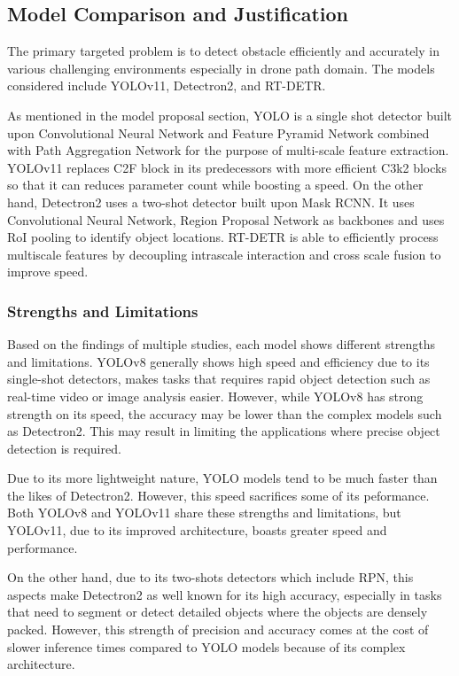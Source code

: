 \documentclass[stu,12pt,floatsintext]{apa7}
\begin{document}
\subsection{Model Comparison and Justification}

The primary targeted problem is to detect obstacle efficiently and accurately in various challenging environments especially in drone path domain. The models considered include YOLOv11, Detectron2, and RT-DETR.

As mentioned in the model proposal section, YOLO is a single shot detector built upon Convolutional Neural Network and Feature Pyramid Network combined with Path Aggregation Network for the purpose of multi-scale feature extraction. YOLOv11 replaces C2F block in its predecessors with more efficient C3k2 blocks so that it can reduces parameter count while boosting a speed. On the other hand, Detectron2 uses a two-shot detector built upon Mask RCNN. It uses Convolutional Neural Network, Region Proposal Network as backbones and uses RoI pooling to identify object locations. RT-DETR is able to efficiently process multiscale features by decoupling intrascale interaction and cross scale fusion to improve speed.


\subsubsection{Strengths and Limitations}
Based on the findings of multiple studies, each model shows different strengths and limitations. YOLOv8 generally shows high speed and efficiency due to its single-shot detectors, makes tasks that requires rapid object detection such as real-time video or image analysis easier. However, while YOLOv8 has strong strength on its speed, the accuracy may be lower than the complex models such as Detectron2. This may result in limiting the applications where precise object detection is required.

Due to its more lightweight nature, YOLO models tend to be much faster than the likes of Detectron2. However, this speed sacrifices some of its peformance. Both YOLOv8 and YOLOv11 share these strengths and limitations, but YOLOv11, due to its improved architecture, boasts greater speed and performance.

On the other hand, due to its two-shots detectors which include RPN, this aspects make Detectron2 as well known for its high accuracy, especially in tasks that need to segment or detect detailed objects where the objects are densely packed. However, this strength of precision and accuracy comes at the cost of slower inference times compared to YOLO models because of its complex architecture.
\end{document}
